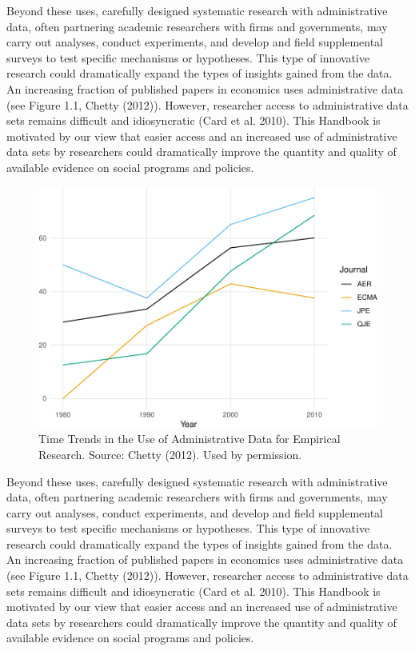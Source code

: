 \documentclass[11pt]{book}
\begin{document}
Beyond these uses, carefully designed systematic research with administrative data, often partnering academic researchers with firms and governments, may carry out analyses, conduct experiments, and develop and field supplemental surveys to test specific mechanisms or hypotheses. This type of innovative research could dramatically expand the types of insights gained from the data. An increasing fraction of published papers in economics uses administrative data (see Figure 1.1, Chetty (2012)). However, researcher access to administrative data sets remains difficult and idiosyncratic (Card et al. 2010). This Handbook is motivated by our view that easier access and an increased use of administrative data sets by researchers could dramatically improve the quantity and quality of available evidence on social programs and policies.
\begin{figure}[t!]
\centering
\includegraphics{figures/introchetty-1.pdf}
\caption{Time Trends in the Use of Administrative Data for Empirical
Research. Source: Chetty (2012). Used by permission.}
\end{figure}
Beyond these uses, carefully designed systematic research with administrative data, often partnering academic researchers with firms and governments, may carry out analyses, conduct experiments, and develop and field supplemental surveys to test specific mechanisms or hypotheses. This type of innovative research could dramatically expand the types of insights gained from the data. An increasing fraction of published papers in economics uses administrative data (see Figure 1.1, Chetty (2012)). However, researcher access to administrative data sets remains difficult and idiosyncratic (Card et al. 2010). This Handbook is motivated by our view that easier access and an increased use of administrative data sets by researchers could dramatically improve the quantity and quality of available evidence on social programs and policies.
\end{document}
